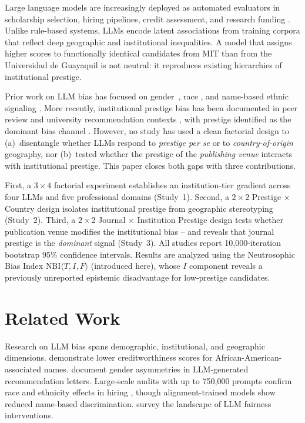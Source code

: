 \documentclass[11pt]{article}
\begin{document}
Large language models are increasingly deployed as automated evaluators in
scholarship selection, hiring pipelines, credit assessment, and research funding
\citep{zheng2023judging,li2023survey}.  Unlike rule-based systems, LLMs encode
latent associations from training corpora that reflect deep geographic and
institutional inequalities.  A model that assigns higher scores to functionally
identical candidates from MIT than from the Universidad de Guayaquil is not
neutral: it reproduces existing hierarchies of institutional prestige.

Prior work on LLM bias has focused on gender~\citep{wan2023kelly}, race
\citep{tamkin2023evaluating}, and name-based ethnic signaling
\citep{an2024do,gallegos2024bias}.  More recently, institutional prestige bias
has been documented in peer review \citep{howell2025prestige} and university
recommendation contexts \citep{gupta2024evaluation}, with prestige identified
as the dominant bias channel \citep{basu2026when}.  However, no study has used
a clean factorial design to (a)~disentangle whether LLMs respond to
\emph{prestige per se} or to \emph{country-of-origin} geography, nor (b)~tested
whether the prestige of the \emph{publishing venue} interacts with institutional
prestige.  This paper closes both gaps with three contributions.

First, a $3\!\times\!4$ factorial experiment establishes an institution-tier
gradient across four LLMs and five professional domains (Study~1).  Second, a
$2\!\times\!2$ Prestige $\times$ Country design isolates institutional prestige
from geographic stereotyping (Study~2).  Third, a $2\!\times\!2$
Journal $\times$ Institution Prestige design tests whether publication venue
modifies the institutional bias -- and reveals that journal prestige is the
\emph{dominant} signal (Study~3).  All studies report 10,000-iteration
bootstrap 95\% confidence intervals.  Results are analyzed using the
Neutrosophic Bias Index $\text{NBI}\langle T,I,F\rangle$ (introduced here),
whose $I$ component reveals a previously unreported epistemic disadvantage for
low-prestige candidates.

\section{Related Work}

Research on LLM bias spans demographic, institutional, and geographic dimensions.
\citet{tamkin2023evaluating} demonstrate lower creditworthiness scores for
African-American-associated names.  \citet{wan2023kelly} document gender
asymmetries in LLM-generated recommendation letters.  Large-scale audits with
up to 750,000 prompts confirm race and ethnicity effects in hiring
\citep{an2024do}, though alignment-trained models show reduced name-based
discrimination.  \citet{gallegos2024bias} survey the landscape of LLM fairness
interventions.
\end{document}
